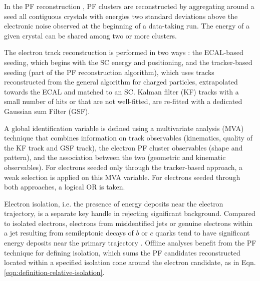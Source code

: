 In the PF reconstruction \citep{JINST-2015-10-P06005}, PF clusters are reconstructed by aggregating around a seed all contiguous crystals with energies two standard deviations above the electronic noise observed at the beginning of a data-taking run. The energy of a given crystal can be shared among two or more clusters.

The electron track reconstruction is performed in two ways \citep{JINST-2015-10-P06005}: the ECAL-based seeding, which begins with the SC energy and positioning, and the tracker-based seeding (part of the PF reconstruction algorithm), which uses tracks reconstructed from the general algorithm for charged particles, extrapolated towards the ECAL and matched to an SC. Kalman filter (KF) tracks with a small number of hits or that are not well-fitted, are re-fitted with a dedicated Gaussian sum Filter (GSF).

A global identification variable \citep{JINST-2015-10-P06005} is defined using a multivariate analysis (MVA) technique that combines information on track observables (kinematics, quality of the KF track and GSF track), the electron PF cluster observables (shape and pattern), and the association between the two (geometric and kinematic observables). For electrons seeded only through the tracker-based approach, a weak selection is applied on this MVA variable. For electrons seeded through both approaches, a logical OR is taken. 

Electron isolation, i.e. the presence of energy deposits near the electron trajectory, is a separate key handle in rejecting significant background. Compared to isolated electrons, electrons from misidentified jets or genuine electrons within a jet resulting from semileptonic decays of $b$ or $c$ quarks tend to have significant energy deposits near the primary trajectory \citep{JINST-2015-10-P06005}. Offline analyses benefit from the PF technique for defining isolation, which sums the PF candidates reconstructed located within a specified isolation cone around the electron candidate, as in Eqn. \ref{eqn:definition-relative-isolation}.

